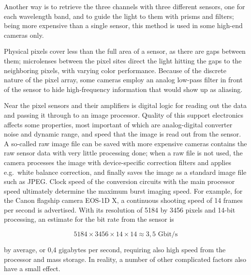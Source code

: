 Another way is to retrieve the three channels with three different sensors, one for each wavelength band, and to guide the light to them with prisms and filters; being more expensive than a single sensor, this method is used in some high-end cameras only.



Physical pixels cover less than the full area of a sensor, as there are gaps between them;
microlenses between the pixel sites direct the light hitting the gaps to the neighboring pixels, with varying color performance.
Because of the discrete nature of the pixel array, some cameras employ an analog low-pass filter in front of the sensor to hide high-frequency information that would show up as aliasing.


Near the pixel sensors and their amplifiers is digital logic for reading out the data and passing it through to an image processor.
Quality of this support electronics affects some properties, most important of which are analog-digital converter noise and dynamic range, and speed that the image is read out from the sensor.
A so-called raw image file can be saved with more expensive cameras contains the raw sensor data with very little processing done;
when a raw file is not used, the camera processes the image with device-specific correction filters and applies e.g.~white balance correction, and finally saves the image as a standard image file such as JPEG.
Clock speed of the conversion circuits with the main processor speed ultimately determine the maximum burst imaging speed.
For example, for the Canon flagship camera EOS-1D X, a continuous shooting speed of 14 frames per second is advertised.
With its resolution of 5184 by 3456 pixels and 14-bit processing, an estimate for the bit rate from the sensor is

\begin{equation} \label{eq:eos1dspeed}
5184 \times 3456 \times 14 \times 14 \approx 3,5\text{ Gbit/s}
\end{equation}

by average, or 0,4 gigabytes per second, requiring also high speed from the processor and mass storage.
In reality, a number of other complicated factors also have a small effect.

